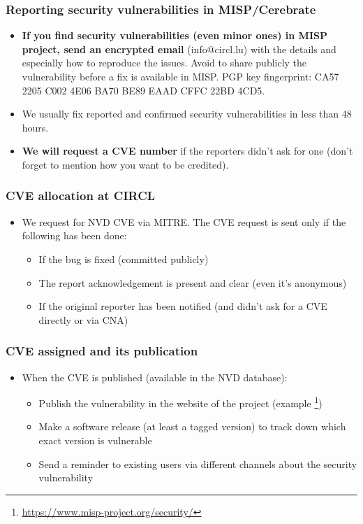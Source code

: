 
\begin{frame}[t,plain]
\titlepage
\end{frame}

\begin{frame}[fragile]
\frametitle{Reporting security vulnerabilities in MISP/Cerebrate}
\begin{itemize}
\item {\bf If you find security vulnerabilities (even minor ones) in MISP project, send an encrypted email} (info@circl.lu) with the details and especially how to reproduce the issues. Avoid to share publicly the vulnerability before a fix is available in MISP. PGP key fingerprint: CA57 2205 C002 4E06 BA70 BE89 EAAD CFFC 22BD 4CD5.
\item We usually fix reported and confirmed security vulnerabilities in less than 48 hours.
\item {\bf We will request a CVE number} if the reporters didn't ask for one (don't forget to mention how you want to be credited).
\end{itemize}
\end{frame}

\begin{frame}[fragile]
\frametitle{CVE allocation at CIRCL}
\begin{itemize}
\item We request for NVD CVE via MITRE. The CVE request is sent only if the following has been done:
        \begin{itemize}
                \item If the bug is fixed (committed publicly)
                \item The report acknowledgement is present and clear (even it's anonymous)
                \item If the original reporter has been notified (and didn't ask for a CVE directly or via CNA)
        \end{itemize}
\end{itemize}
\end{frame}

\begin{frame}[fragile]
\frametitle{CVE assigned and its publication}
\begin{itemize}
       \item When the CVE is published (available in the NVD database):
        \begin{itemize}
                \item Publish the vulnerability in the website of the project (example \footnote{\url{https://www.misp-project.org/security/}})
                \item Make a software release (at least a tagged version) to track down which exact version is vulnerable
                \item Send a reminder to existing users via different channels about the security vulnerability
        \end{itemize}
\end{itemize}
\end{frame}


